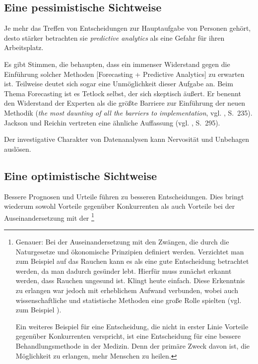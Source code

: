 
\subsection{Eine pessimistische Sichtweise}

Je mehr das Treffen von Entscheidungen zur Hauptaufgabe von Personen gehört,
desto stärker betrachten sie \emph{predictive analytics} als eine Gefahr für
ihren Arbeitsplatz.

Es gibt Stimmen, die behaupten, dass ein immenser Widerstand gegen die
Einführung solcher Methoden [Forecasting + Predictive Analytics] zu erwarten
ist. Teilweise deutet sich sogar eine Unmöglichkeit dieser Aufgabe an. Beim 
Thema Forecasting ist es Tetlock selbst, der sich skeptisch äußert. Er
benennt den Widerstand der Experten als die größte Barriere zur Einführung der
neuen Methodik (\emph{the most daunting of all the barriers to implementation},
vgl. \cite{Tetlock}, S.~235). Jackson und Reichin vertreten eine ähnliche
Auffassung (vgl. \cite{Jackson}, S.~295).

Der investigative Charakter von Datenanalysen kann Nervosität und Unbehagen
auslösen.

\subsection{Eine optimistische Sichtweise}


Bessere Prognosen und Urteile führen zu besseren Entscheidungen. Dies bringt
wiederum sowohl Vorteile gegenüber Konkurrenten als auch Vorteile bei der
Auseinandersetzung mit der \grqq\footnote{
Genauer: Bei der Auseinandersetzung mit den Zwängen, die durch die Naturgesetze
und ökonomische Prinzipien definiert werden. Verzichtet man zum Beispiel auf das 
Rauchen kann es als eine gute Entscheidung betrachtet werden, da man dadurch
gesünder lebt. Hierfür muss zunächst erkannt werden, dass Rauchen ungesund ist.
Klingt heute einfach. Diese Erkenntnis zu erlangen war jedoch mit erheblichem
Aufwand verbunden, wobei auch wissenschaftliche und statistische Methoden
eine große Rolle spielten (vgl. zum Beispiel \cite{Proctor}).

Ein weiteres Beispiel für eine Entscheidung, die nicht in erster Linie Vorteile
gegenüber Konkurrenten verspricht, ist eine Entscheidung für eine bessere
Behandlungsmethode in der Medizin. Denn der primäre Zweck davon ist, die 
Möglichkeit zu erlangen, mehr Menschen zu heilen.
}


